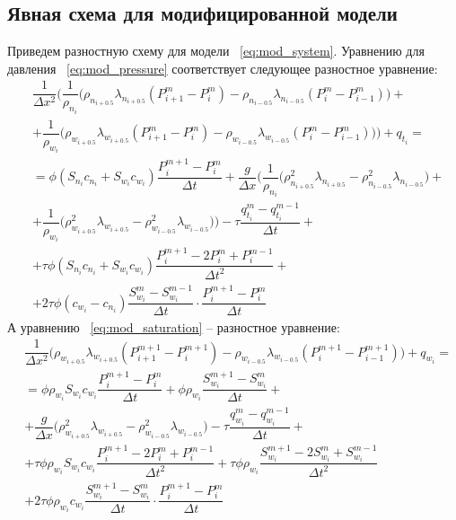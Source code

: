 \subsection{Явная схема для модифицированной модели}
\label{mod_model_explicit}
Приведем разностную схему для модели ~\ref{eq:mod_system}.
Уравнению для давления ~\ref{eq:mod_pressure} соответствует следующее разностное уравнение:
\begin{equation} \label{eq:mod_scheme_p}
 \begin{aligned} 
  & \dfrac{1}{\Delta x^2} \bigg(\dfrac{1}{\rho_{n_i}} \big( \rho_{n_{i+0.5}} \lambda_{n_{i+0.5}} (P_{i+1}^m - P_i^m)
  - \rho_{n_{i-0.5}} \lambda_{n_{i-0.5}} (P_i^m - P_{i-1}^m)\big) + \\
  &+ \dfrac{1}{\rho_{w_i}} \big( \rho_{w_{i+0.5}} \lambda_{w_{i+0.5}} (P_{i+1}^m - P_i^m)
  - \rho_{w_{i-0.5}} \lambda_{w_{i-0.5}} (P_i^m - P_{i-1}^m)\big)\bigg) + q_{t_i} = \\
  &= \phi(S_{n_i}c_{n_i}+S_{w_i}c_{w_i}) \dfrac{P_i^{m+1} - P_i^m}{\Delta t}
  + \dfrac{g}{\Delta x} \bigg(\dfrac{1}{\rho_{n_i}} \big( \rho_{n_{i+0.5}}^2 \lambda_{n_{i+0.5}} 
  - \rho_{n_{i-0.5}}^2 \lambda_{n_{i-0.5}} \big) + \\
  &+ \dfrac{1}{\rho_{w_i}} \big( \rho_{w_{i+0.5}}^2 \lambda_{w_{i+0.5}} 
  - \rho_{w_{i-0.5}}^2 \lambda_{w_{i-0.5}} \big)\bigg)
  - \tau \dfrac{q_{t_i}^m-q_{t_i}^{m-1}}{\Delta t} + \\
  &+ \tau \phi (S_{n_i}c_{n_i}+S_{w_i}c_{w_i}) \dfrac{P_i^{m+1}-2P_i^m+P_i^{m-1}}{\Delta t^2} +\\
  &+ 2 \tau \phi (c_{w_i}-c_{n_i}) \dfrac{S_{w_i}^m-S_{w_i}^{m-1}}{\Delta t} \cdot \dfrac{P_i^{m+1}-P_i^m}{\Delta t}
 \end{aligned}
\end{equation}
А уравнению ~\ref{eq:mod_saturation} -- разностное уравнение:
\begin{equation} \label{eq:mod_scheme_s}
 \begin{aligned} 
  & \dfrac{1}{\Delta x^2} \bigg(\rho_{w_{i+0.5}} \lambda_{w_{i+0.5}} (P_{i+1}^{m+1} - P_i^{m+1})
  - \rho_{w_{i-0.5}} \lambda_{w_{i-0.5}} (P_i^{m+1} - P_{i-1}^{m+1}) \bigg) + q_{w_i} = \\
  &= \phi\rho_{w_i}S_{w_i}c_{w_i} \dfrac{P_i^{m+1} - P_i^m}{\Delta t} + \phi\rho_{w_i} \dfrac{S_{w_i}^{m+1} - S_{w_i}^m}{\Delta t} +\\ 
  &+ \dfrac{g}{\Delta x} \bigg(\rho_{w_{i+0.5}}^2 \lambda_{w_{i+0.5}} - \rho_{w_{i-0.5}}^2 \lambda_{w_{i-0.5}} \bigg)
  - \tau \dfrac{q_{w_i}^m-q_{w_i}^{m-1}}{\Delta t} + \\
  &+ \tau \phi \rho_{w_i}S_{w_i}c_{w_i} \dfrac{P_i^{m+1}-2P_i^m+P_i^{m-1}}{\Delta t^2}
  + \tau \phi \rho_{w_i} \dfrac{S_{w_i}^{m+1}-2S_{w_i}^m+S_{w_i}^{m-1}}{\Delta t^2} \\
  &+ 2 \tau \phi \rho_{w_i} c_{w_i} \dfrac{S_{w_i}^{m+1}-S_{w_i}^{m}}{\Delta t} \cdot \dfrac{P_i^{m+1}-P_i^m}{\Delta t}
 \end{aligned}
\end{equation}
